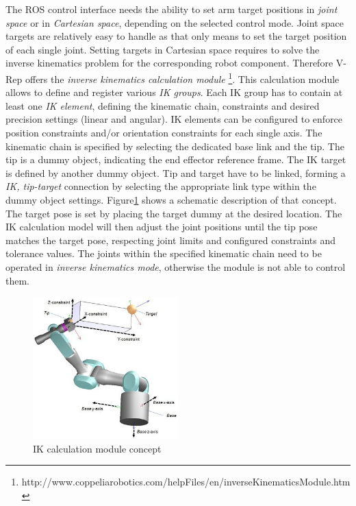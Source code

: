 The ROS control interface needs the ability to set arm target positions in \emph{joint space} or in \emph{Cartesian space}, depending on the selected control mode. Joint space targets are relatively easy to handle as that only means to set the target position of each single joint. Setting targets in Cartesian space requires to solve the inverse kinematics problem for the corresponding robot component. Therefore V-Rep offers the \emph{inverse kinematics calculation module} \footnote{http://www.coppeliarobotics.com/helpFiles/en/inverseKinematicsModule.htm}. 
This calculation module allows to define and register various \emph{IK groups}. Each IK group has to contain at least one \emph{IK element}, defining the kinematic chain, constraints and desired precision settings (linear and angular). IK elements can be configured to enforce position constraints and/or orientation constraints for each single axis. The kinematic chain is specified by selecting the dedicated base link and the tip. The tip is a dummy object, indicating the end effector reference frame. The IK target is defined by another dummy object. Tip and target have to be linked, forming a \emph{IK, tip-target} connection by selecting the appropriate link type within the dummy object settings. Figure\ref{fig:ik_vrep} shows a schematic description of that concept. The target pose is set by placing the target dummy at the desired location. The IK calculation model will then adjust the joint positions until the tip pose matches the target pose, respecting joint limits and configured constraints and tolerance values. The joints within the specified kinematic chain need to be operated in \emph{inverse kinematics mode}, otherwise the module is not able to control them.

\begin{figure}[ht]
	\centering
  	\includegraphics[width=0.5\textwidth]{images/ik_vrep.jpg}
	\caption{IK calculation module concept}
	\label{fig:ik_vrep}
\end{figure}

